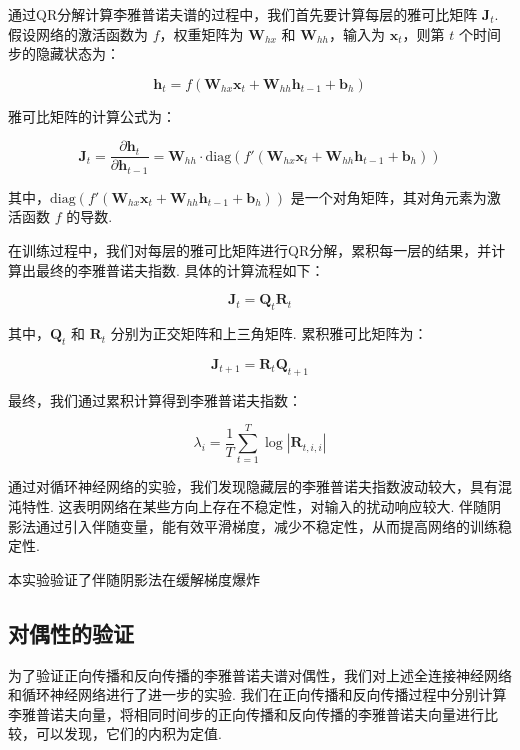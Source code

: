 通过QR分解计算李雅普诺夫谱的过程中，我们首先要计算每层的雅可比矩阵 \(\mathbf{J}_t\). 假设网络的激活函数为 \( f \)，权重矩阵为 \(\mathbf{W}_{hx}\) 和 \(\mathbf{W}_{hh}\)，输入为 \(\mathbf{x}_t\)，则第 \(t\) 个时间步的隐藏状态为：

\[
\mathbf{h}_t = f(\mathbf{W}_{hx} \mathbf{x}_t + \mathbf{W}_{hh} \mathbf{h}_{t-1} + \mathbf{b}_h)
\]

雅可比矩阵的计算公式为：

\[
\mathbf{J}_t = \frac{\partial \mathbf{h}_t}{\partial \mathbf{h}_{t-1}} = \mathbf{W}_{hh} \cdot \text{diag}(f'(\mathbf{W}_{hx} \mathbf{x}_t + \mathbf{W}_{hh} \mathbf{h}_{t-1} + \mathbf{b}_h))
\]

其中，\(\text{diag}(f'(\mathbf{W}_{hx} \mathbf{x}_t + \mathbf{W}_{hh} \mathbf{h}_{t-1} + \mathbf{b}_h))\) 是一个对角矩阵，其对角元素为激活函数 \(f\) 的导数. 

在训练过程中，我们对每层的雅可比矩阵进行QR分解，累积每一层的结果，并计算出最终的李雅普诺夫指数. 具体的计算流程如下：

\[
\mathbf{J}_t = \mathbf{Q}_t \mathbf{R}_t
\]

其中，\(\mathbf{Q}_t\) 和 \(\mathbf{R}_t\) 分别为正交矩阵和上三角矩阵. 累积雅可比矩阵为：

\[
\mathbf{J}_{t+1} = \mathbf{R}_t \mathbf{Q}_{t+1}
\]

最终，我们通过累积计算得到李雅普诺夫指数：

\[
\lambda_i = \frac{1}{T} \sum_{t=1}^T \log |\mathbf{R}_{t,i,i}|
\]

通过对循环神经网络的实验，我们发现隐藏层的李雅普诺夫指数波动较大，具有混沌特性. 这表明网络在某些方向上存在不稳定性，对输入的扰动响应较大. 伴随阴影法通过引入伴随变量，能有效平滑梯度，减少不稳定性，从而提高网络的训练稳定性. 

本实验验证了伴随阴影法在缓解梯度爆炸

\subsection{对偶性的验证}

为了验证正向传播和反向传播的李雅普诺夫谱对偶性，我们对上述全连接神经网络和循环神经网络进行了进一步的实验. 我们在正向传播和反向传播过程中分别计算李雅普诺夫向量，将相同时间步的正向传播和反向传播的李雅普诺夫向量进行比较，可以发现，它们的内积为定值. 

